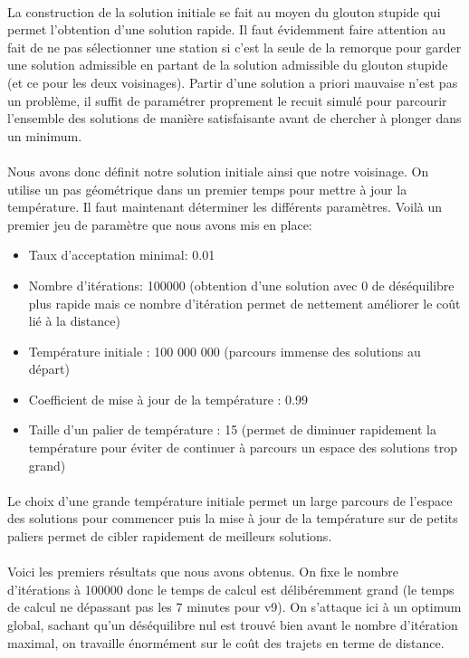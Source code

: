 \documentclass[a4paper, 11pt]{article} %
\begin{document}
\paragraph*{}
La construction de la solution initiale se fait au moyen du glouton stupide qui permet l'obtention d'une solution rapide. Il faut évidemment faire attention au fait de ne pas sélectionner une station si c'est la seule de la remorque pour garder une solution admissible en partant de la solution admissible du glouton stupide (et ce pour les deux voisinages). Partir d'une solution a priori mauvaise n'est pas un problème, il suffit de paramétrer proprement le recuit simulé pour parcourir l'ensemble des solutions de manière satisfaisante avant de chercher à plonger dans un minimum.

\paragraph*{}
Nous avons donc définit notre solution initiale ainsi que notre voisinage. On utilise un pas géométrique dans un premier temps pour mettre à jour la température. Il faut maintenant déterminer les différents paramètres. Voilà un premier jeu de paramètre que nous avons mis en place:
\begin{itemize}
\item Taux d'acceptation minimal: 0.01
\item Nombre d'itérations: 100000 (obtention d'une solution avec 0 de déséquilibre plus rapide mais ce nombre d'itération permet de nettement améliorer le coût lié à la distance)
\item Température initiale : 100 000 000 (parcours immense des solutions au départ)
\item Coefficient de mise à jour de la température : 0.99 
\item Taille d'un palier de température : 15 (permet de diminuer rapidement la température pour éviter de continuer à parcours un espace des solutions trop grand)
\end{itemize}

\paragraph*{}
Le choix d'une grande température initiale permet un large parcours de l'espace des solutions pour commencer puis la mise à jour de la température sur de petits paliers permet de cibler rapidement de meilleurs solutions.

\paragraph*{}
Voici les premiers résultats que nous avons obtenus. On fixe le nombre d'itérations à 100000 donc le temps de calcul est délibéremment grand (le temps de calcul ne dépassant pas les 7 minutes pour v9). On s'attaque ici à un optimum global, sachant qu'un déséquilibre nul est trouvé bien avant le nombre d'itération maximal, on travaille énormément sur le coût des trajets en terme de distance.
\end{document}
